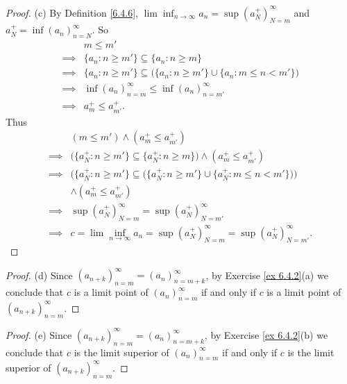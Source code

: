 \begin{proof}{(c)}
    By Definition \ref{6.4.6}, \(\lim\inf_{n \to \infty} a_n = \sup(a_N^+)_{N = m}^\infty\) and \(a_N^+ = \inf(a_n)_{n = N}^\infty\).
    So
    \begin{align*}
                 & m \leq m'                                                                                \\
        \implies & \{a_n : n \geq m'\} \subseteq \{a_n : n \geq m\}                                         \\
        \implies & \{a_n : n \geq m'\} \subseteq \big(\{a_n : n \geq m'\} \cup \{a_n : m \leq n < m'\}\big) \\
        \implies & \inf(a_n)_{n = m}^\infty \leq \inf(a_n)_{n = m'}^\infty                                  \\
        \implies & a_m^+ \leq a_{m'}^+.
    \end{align*}
    Thus
    \begin{align*}
                 & (m \leq m') \land (a_m^+ \leq a_{m'}^+)                                                                    \\
        \implies & \big(\{a_N^+ : n \geq m'\} \subseteq \{a_N^+ : n \geq m\}\big) \land (a_m^+ \leq a_{m'}^+)                 \\
        \implies & \bigg(\{a_N^+ : n \geq m'\} \subseteq \big(\{a_N^+ : n \geq m'\} \cup \{a_N^+ : m \leq n < m'\}\big)\bigg) \\
                 & \land (a_m^+ \leq a_{m'}^+)                                                                                \\
        \implies & \sup(a_N^+)_{N = m}^\infty = \sup(a_N^+)_{N = m'}^\infty                                                   \\
        \implies & c = \lim\inf_{n \to \infty} a_n = \sup(a_N^+)_{N = m}^\infty = \sup(a_N^+)_{N = m'}^\infty.
    \end{align*}
\end{proof}

\begin{proof}{(d)}
    Since \((a_{n + k})_{n = m}^\infty = (a_n)_{n = m + k}^\infty\), by Exercise \ref{ex 6.4.2}(a) we conclude that \(c\) is a limit point of \((a_n)_{n = m}^\infty\) if and only if \(c\) is a limit point of \((a_{n + k})_{n = m}^\infty\).
\end{proof}

\begin{proof}{(e)}
    Since \((a_{n + k})_{n = m}^\infty = (a_n)_{n = m + k}^\infty\), by Exercise \ref{ex 6.4.2}(b) we conclude that \(c\) is the limit superior of \((a_n)_{n = m}^\infty\) if and only if \(c\) is the limit superior of \((a_{n + k})_{n = m}^\infty\).
\end{proof}

